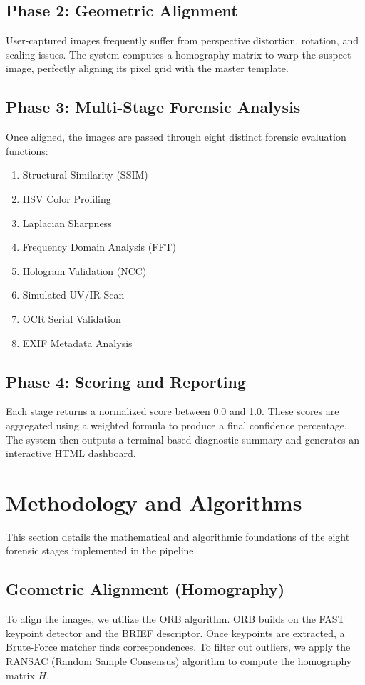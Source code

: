\documentclass[12pt,a4paper]{article}
\begin{document}
\subsection{Phase 2: Geometric Alignment}
User-captured images frequently suffer from perspective distortion, rotation, and scaling issues. The system computes a homography matrix to warp the suspect image, perfectly aligning its pixel grid with the master template.

\subsection{Phase 3: Multi-Stage Forensic Analysis}
Once aligned, the images are passed through eight distinct forensic evaluation functions:
\begin{enumerate}
    \item Structural Similarity (SSIM)
    \item HSV Color Profiling
    \item Laplacian Sharpness
    \item Frequency Domain Analysis (FFT)
    \item Hologram Validation (NCC)
    \item Simulated UV/IR Scan
    \item OCR Serial Validation
    \item EXIF Metadata Analysis
\end{enumerate}

\subsection{Phase 4: Scoring and Reporting}
Each stage returns a normalized score between 0.0 and 1.0. These scores are aggregated using a weighted formula to produce a final confidence percentage. The system then outputs a terminal-based diagnostic summary and generates an interactive HTML dashboard.

\newpage

\section{Methodology and Algorithms}

This section details the mathematical and algorithmic foundations of the eight forensic stages implemented in the pipeline.

\subsection{Geometric Alignment (Homography)}
To align the images, we utilize the ORB algorithm. ORB builds on the FAST keypoint detector and the BRIEF descriptor. Once keypoints are extracted, a Brute-Force matcher finds correspondences. To filter out outliers, we apply the RANSAC (Random Sample Consensus) algorithm to compute the homography matrix $H$.
\end{document}
